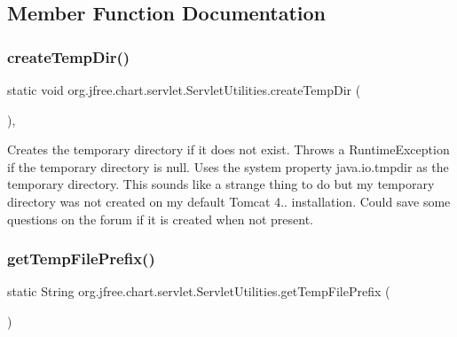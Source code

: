 \subsection{Member Function Documentation}
\mbox{\label{classorg_1_1jfree_1_1chart_1_1servlet_1_1_servlet_utilities_af4bff5a1ae6bd3eb2ae4fe558a52eba6}} 
\subsubsection{\texorpdfstring{create\+Temp\+Dir()}{createTempDir()}}
{\footnotesize\ttfamily static void org.\+jfree.\+chart.\+servlet.\+Servlet\+Utilities.\+create\+Temp\+Dir (\begin{DoxyParamCaption}{ }\end{DoxyParamCaption})\hspace{0.3cm}{\ttfamily [static]}, {\ttfamily [protected]}}

Creates the temporary directory if it does not exist. Throws a {\ttfamily Runtime\+Exception} if the temporary directory is {\ttfamily null}. Uses the system property {\ttfamily java.\+io.\+tmpdir} as the temporary directory. This sounds like a strange thing to do but my temporary directory was not created on my default Tomcat 4.. installation. Could save some questions on the forum if it is created when not present. \mbox{\label{classorg_1_1jfree_1_1chart_1_1servlet_1_1_servlet_utilities_afa4bff11c42f4afca7ebbfa5238cbdbb}} 
\subsubsection{\texorpdfstring{get\+Temp\+File\+Prefix()}{getTempFilePrefix()}}
{\footnotesize\ttfamily static String org.\+jfree.\+chart.\+servlet.\+Servlet\+Utilities.\+get\+Temp\+File\+Prefix (\begin{DoxyParamCaption}{ }\end{DoxyParamCaption})\hspace{0.3cm}{\ttfamily [static]}}

